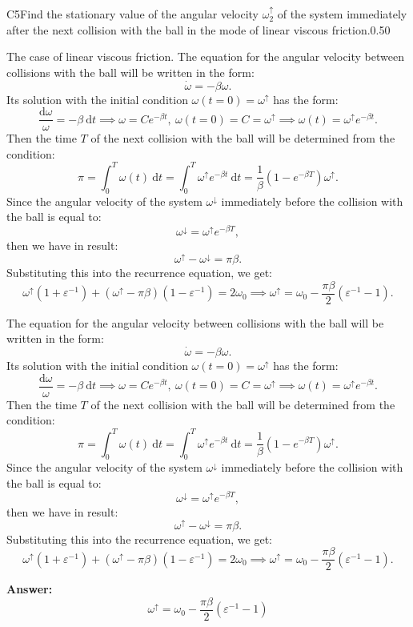 \documentclass[11pt,a4paper]{article}
\begin{document}
\begin{solcard}{C5}{Find the stationary value of the angular velocity $\omega^\uparrow_2$ of the system immediately after the next collision with the ball in the mode of linear viscous friction.}{0.50}

The case of linear viscous friction. The equation for the angular velocity between collisions with the ball will be written in the form: \[\dot\omega=-\beta\omega.\] Its solution with the initial condition $\omega(t=0)=\omega^\uparrow$ has the form: \[\frac{\mathrm d\omega}\omega=-\beta~\mathrm dt\implies \omega=Ce^{-\beta t},~\omega(t=0)=C=\omega^\uparrow\implies\omega(t)=\omega^\uparrow e^{-\beta t}.\] Then the time $T$ of the next collision with the ball will be determined from the condition: \[\pi=\int_0^T\omega(t)~\mathrm dt=\int_0^T\omega^\uparrow e^{-\beta t}~\mathrm dt=\frac1\beta\left(1-e^{-\beta T}\right)\omega^\uparrow.\] Since the angular velocity of the system $\omega^\downarrow$ immediately before the collision with the ball is equal to: \[\omega^\downarrow=\omega^\uparrow e^{-\beta T},\] then we have in result:\[\omega^\uparrow-\omega^\downarrow=\pi\beta.\]Substituting this into the recurrence equation, we get:\[\omega^\uparrow\left(1+\varepsilon^{-1}\right)+\left(\omega^\uparrow-\pi\beta\right)\left(1-\varepsilon^{-1}\right)=2\omega_0\implies\omega^\uparrow=\omega_0-\frac{\pi\beta}2\left(\varepsilon^{-1}-1\right).\]


The equation for the angular velocity between collisions with the ball will be written in the form: \[\dot\omega=-\beta\omega.\] Its solution with the initial condition $\omega(t=0)=\omega^\uparrow$ has the form: \[\frac{\mathrm d\omega}\omega=-\beta~\mathrm dt\implies \omega=Ce^{-\beta t},~\omega(t=0)=C=\omega^\uparrow\implies\omega(t)=\omega^\uparrow e^{-\beta t}.\] Then the time $T$ of the next collision with the ball will be determined from the condition: \[\pi=\int_0^T\omega(t)~\mathrm dt=\int_0^T\omega^\uparrow e^{-\beta t}~\mathrm dt=\frac1\beta\left(1-e^{-\beta T}\right)\omega^\uparrow.\] Since the angular velocity of the system $\omega^\downarrow$ immediately before the collision with the ball is equal to: \[\omega^\downarrow=\omega^\uparrow e^{-\beta T},\] then we have in result:\[\omega^\uparrow-\omega^\downarrow=\pi\beta.\]Substituting this into the recurrence equation, we get:\[\omega^\uparrow\left(1+\varepsilon^{-1}\right)+\left(\omega^\uparrow-\pi\beta\right)\left(1-\varepsilon^{-1}\right)=2\omega_0\implies\omega^\uparrow=\omega_0-\frac{\pi\beta}2\left(\varepsilon^{-1}-1\right).\]

\par\smallskip\noindent\textbf{Answer:} \[\omega^\uparrow=\omega_0-\frac{\pi\beta}2\left(\varepsilon^{-1}-1\right)\]
\end{solcard}
\end{document}
